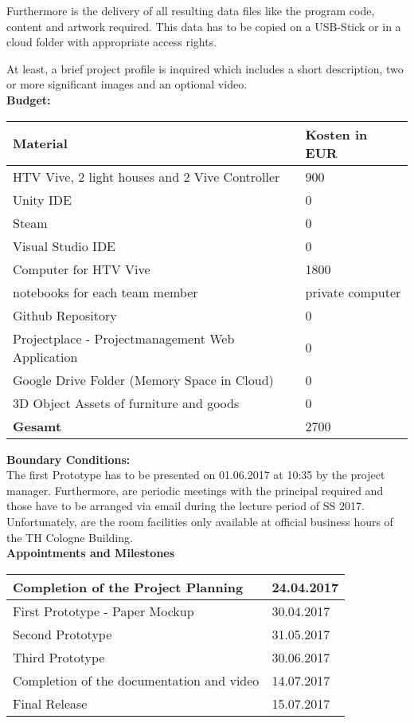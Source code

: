 \documentclass[a4paper, 12pt]{article}
\begin{document}
Furthermore is the delivery of all resulting data files like the program code, content and artwork required. This data has to be copied on a USB-Stick or in a cloud folder with appropriate access rights.

At least, a brief project profile is inquired which includes a short description, two or more significant images and an optional video.\\


\textbf{Budget:}\\

\begin{tabular}{| l | l |}
\hline
\textbf{Material} & \textbf{Kosten in EUR}\\\hline
 HTV Vive, 2 light houses and 2 Vive Controller & 900\\  \hline
 Unity IDE  & 0\\ \hline
 Steam  & 0\\ \hline
 Visual Studio IDE  & 0\\ \hline
 Computer for HTV Vive  & 1800 \\ \hline
 notebooks for each team member  & private computer \\ \hline
 Github Repository & 0\\ \hline
Projectplace - Projectmanagement Web Application& 0\\ \hline
Google Drive Folder (Memory Space in Cloud) & 0\\ \hline
3D Object Assets of furniture and goods & 0\\ \hline
 \textbf{Gesamt} & 2700\\
 \hline
\end{tabular}
\bigskip

\textbf{Boundary Conditions:}\\

The first Prototype has to be presented on 01.06.2017 at 10:35 by the project manager. Furthermore, are periodic meetings with the principal required and those have to be arranged via email during the lecture period of SS 2017. Unfortunately, are the room facilities only available at official business hours of the TH Cologne Building. \\

\textbf{Appointments and Milestones}\\

\begin{tabular}{|l | l |}
	\hline
	 Completion of the Project Planning & 24.04.2017\\\hline
	 First Prototype - Paper Mockup & 30.04.2017\\\hline
	 Second Prototype & 31.05.2017\\\hline
	 Third Prototype& 30.06.2017\\\hline
	 Completion of the documentation and video & 14.07.2017\\\hline
	 Final Release& 15.07.2017\\\hline
\end{tabular}
\end{document}

